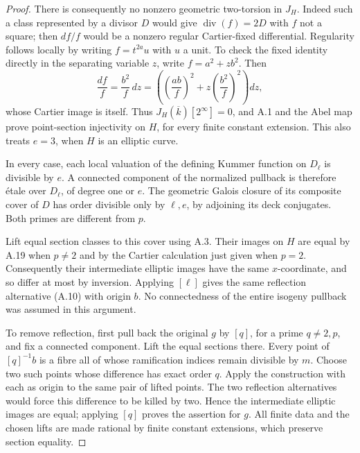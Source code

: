 \begin{proof}
There is consequently no nonzero geometric two-torsion
in $J_H$. Indeed such a class represented by a divisor $D$
would give $\operatorname{div}(f)=2D$ with $f$ not a square;
then $df/f$ would be a nonzero regular Cartier-fixed
differential. Regularity follows locally by writing
$f=t^{2a}u$ with $u$ a unit. To check the fixed identity
directly in the separating variable $z$, write
$f=a^2+zb^2$. Then
\[
 \frac{df}{f}=\frac{b^2}{f}\,dz
 =\left(\left(\frac{ab}{f}\right)^2
       +z\left(\frac{b^2}{f}\right)^2\right)dz,
\]
whose Cartier image is itself. Thus
$J_H(\overline k)[2^\infty]=0$, and A.1 and the Abel map
prove point-section injectivity on $H$, for every finite
constant extension. This also treats $e=3$, when $H$ is
an elliptic curve.

In every case, each local valuation of the defining
Kummer function on
$D_\ell$ is divisible by $e$. A connected component of the
normalized pullback is therefore \'etale over $D_\ell$,
of degree one or $e$. The geometric Galois closure of its
composite cover of $D$ has order divisible only by
$\ell,e$, by adjoining its deck conjugates. Both primes
are different from $p$.

Lift equal section classes to this cover using A.3. Their
images on $H$ are equal by A.19 when $p\ne2$ and by the
Cartier calculation just given when $p=2$. Consequently their
intermediate elliptic images have the same $x$-coordinate,
and so differ at most by inversion. Applying $[\ell]$
gives the same reflection alternative (A.10) with origin
$b$. No connectedness of the entire isogeny pullback was
assumed in this argument.

To remove reflection, first pull back the original $g$ by
$[q]$, for a prime $q\ne2,p$, and fix a connected component.
Lift the equal sections there. Every point of $[q]^{-1}b$
is a fibre all of whose ramification indices remain
divisible by $m$. Choose two such points whose difference
has exact order $q$. Apply the construction with each as
origin to the same pair of lifted points. The two
reflection alternatives would force this difference to
be killed by two. Hence the intermediate elliptic images
are equal; applying $[q]$ proves the assertion for $g$.
All finite data and the chosen lifts are made rational by
finite constant extensions, which preserve section equality.
\end{proof}

